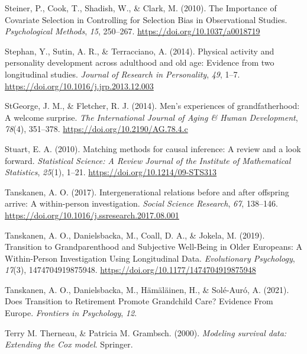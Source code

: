 \documentclass[
  english,
  man,floatsintext]{apa7}
\begin{document}
\leavevmode\hypertarget{ref-steinerImportanceCovariateSelection2010}{}%
Steiner, P., Cook, T., Shadish, W., \& Clark, M. (2010). The Importance of Covariate Selection in Controlling for Selection Bias in Observational Studies. \emph{Psychological Methods}, \emph{15}, 250--267. \url{https://doi.org/10.1037/a0018719}

\leavevmode\hypertarget{ref-stephanPhysicalActivityPersonality2014}{}%
Stephan, Y., Sutin, A. R., \& Terracciano, A. (2014). Physical activity and personality development across adulthood and old age: Evidence from two longitudinal studies. \emph{Journal of Research in Personality}, \emph{49}, 1--7. \url{https://doi.org/10.1016/j.jrp.2013.12.003}

\leavevmode\hypertarget{ref-stgeorgeMenExperiencesGrandfatherhood2014}{}%
StGeorge, J. M., \& Fletcher, R. J. (2014). Men's experiences of grandfatherhood: A welcome surprise. \emph{The International Journal of Aging \& Human Development}, \emph{78}(4), 351--378. \url{https://doi.org/10.2190/AG.78.4.c}

\leavevmode\hypertarget{ref-stuartMatchingMethodsCausal2010}{}%
Stuart, E. A. (2010). Matching methods for causal inference: A review and a look forward. \emph{Statistical Science: A Review Journal of the Institute of Mathematical Statistics}, \emph{25}(1), 1--21. \url{https://doi.org/10.1214/09-STS313}

\leavevmode\hypertarget{ref-tanskanenIntergenerationalRelationsOffspring2017}{}%
Tanskanen, A. O. (2017). Intergenerational relations before and after offspring arrive: A within-person investigation. \emph{Social Science Research}, \emph{67}, 138--146. \url{https://doi.org/10.1016/j.ssresearch.2017.08.001}

\leavevmode\hypertarget{ref-tanskanenTransitionGrandparenthoodSubjective2019}{}%
Tanskanen, A. O., Danielsbacka, M., Coall, D. A., \& Jokela, M. (2019). Transition to Grandparenthood and Subjective Well-Being in Older Europeans: A Within-Person Investigation Using Longitudinal Data. \emph{Evolutionary Psychology}, \emph{17}(3), 1474704919875948. \url{https://doi.org/10.1177/1474704919875948}

\leavevmode\hypertarget{ref-tanskanenDoesTransitionRetirement2021a}{}%
Tanskanen, A. O., Danielsbacka, M., Hämäläinen, H., \& Solé-Auró, A. (2021). Does Transition to Retirement Promote Grandchild Care? Evidence From Europe. \emph{Frontiers in Psychology}, \emph{12}.

\leavevmode\hypertarget{ref-R-survival-book}{}%
Terry M. Therneau, \& Patricia M. Grambsch. (2000). \emph{Modeling survival data: Extending the Cox model}. Springer.
\end{document}
